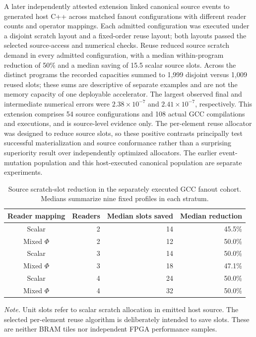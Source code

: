 \documentclass{article}
\newcommand{\tablenote}[1]{\par\vspace{3pt}\begin{minipage}{\linewidth}\footnotesize\emph{Note.} #1\end{minipage}}
\begin{document}
A later independently attested extension linked canonical source events to generated host C++ across matched fanout configurations with different reader counts and operator mappings. Each admitted configuration was executed under a disjoint scratch layout and a fixed-order reuse layout; both layouts passed the selected source-access and numerical checks. Reuse reduced source scratch demand in every admitted configuration, with a median within-program reduction of 50\% and a median saving of 15.5 scalar source slots. Across the distinct programs the recorded capacities summed to 1,999 disjoint versus 1,009 reused slots; these sums are descriptive of separate examples and are not the memory capacity of one deployable accelerator. The largest observed final and intermediate numerical errors were $2.38\times 10^{-7}$ and $2.41\times 10^{-7}$, respectively. This extension comprises 54 source configurations and 108 actual GCC compilations and executions, and is source-level evidence only. The per-element reuse allocator was designed to reduce source slots, so these positive contrasts principally test successful materialization and source conformance rather than a surprising superiority result over independently optimized allocators. The earlier event-mutation population and this host-executed canonical population are separate experiments.

\begin{table}[t]
\centering
\caption{Source scratch-slot reduction in the separately executed GCC fanout cohort. Medians summarize nine fixed profiles in each stratum.}
\label{tab:c1-source-effect}
\small
\setlength{\tabcolsep}{5pt}
\begin{tabularx}{\linewidth}{@{}crrr@{}}
\toprule
Reader mapping & Readers & Median slots saved & Median reduction \\
\midrule
Scalar & 2 & 14 & 45.5\% \\
Mixed $\Phi$ & 2 & 12 & 50.0\% \\
Scalar & 3 & 14 & 50.0\% \\
Mixed $\Phi$ & 3 & 18 & 47.1\% \\
Scalar & 4 & 24 & 50.0\% \\
Mixed $\Phi$ & 4 & 32 & 50.0\% \\
\bottomrule
\end{tabularx}
\tablenote{Unit slots refer to scalar scratch allocation in emitted host source. The selected per-element reuse algorithm is deliberately intended to save slots. These are neither BRAM tiles nor independent FPGA performance samples.}
\end{table}
\end{document}
